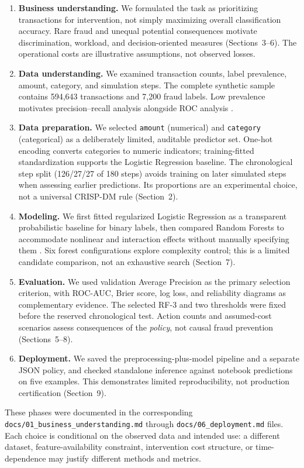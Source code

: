 \documentclass[11pt,a4paper]{article}
\begin{document}
\begin{enumerate}
\item \textbf{Business understanding.}
We formulated the task as prioritizing transactions for intervention,
not simply maximizing overall classification accuracy. Rare fraud
and unequal potential consequences motivate discrimination,
workload, and decision-oriented measures (Sections~3--6).
The operational costs are illustrative assumptions, not observed losses.
\item \textbf{Data understanding.}
We examined transaction counts, label prevalence, amount, category,
and simulation steps. The complete synthetic sample contains
594,643 transactions and 7,200 fraud labels. Low prevalence motivates
precision--recall analysis alongside ROC analysis
\cite{saito2015,fawcett2006}.
\item \textbf{Data preparation.}
We selected \texttt{amount} (numerical) and \texttt{category}
(categorical) as a deliberately limited, auditable predictor set.
One-hot encoding converts categories to numeric indicators;
training-fitted standardization supports the Logistic Regression
baseline. The chronological step split (126/27/27 of 180 steps)
avoids training on later simulated steps when assessing earlier
predictions. Its proportions are an experimental choice, not a
universal CRISP-DM rule (Section~2).
\item \textbf{Modeling.}
We first fitted regularized Logistic Regression as a transparent
probabilistic baseline for binary labels, then compared Random
Forests to accommodate nonlinear and interaction effects without
manually specifying them \cite{james2023,hastie2009,breiman2001}.
Six forest configurations explore complexity control; this is
a limited candidate comparison, not an exhaustive search (Section~7).
\item \textbf{Evaluation.}
We used validation Average Precision as the primary selection
criterion, with ROC-AUC, Brier score, log loss, and reliability
diagrams as complementary evidence. The selected RF-3 and two
thresholds were fixed before the reserved chronological test.
Action counts and assumed-cost scenarios assess consequences of
the \emph{policy}, not causal fraud prevention (Sections~5--8).
\item \textbf{Deployment.}
We saved the preprocessing-plus-model pipeline and a separate
JSON policy, and checked standalone inference against notebook
predictions on five examples. This demonstrates limited
reproducibility, not production certification (Section~9).
\end{enumerate}
These phases were documented in the corresponding
\texttt{docs/01\_business\_understanding.md} through
\texttt{docs/06\_deployment.md} files. Each choice is conditional
on the observed data and intended use: a different dataset,
feature-availability constraint, intervention cost structure,
or time-dependence may justify different methods and metrics.
\end{document}

